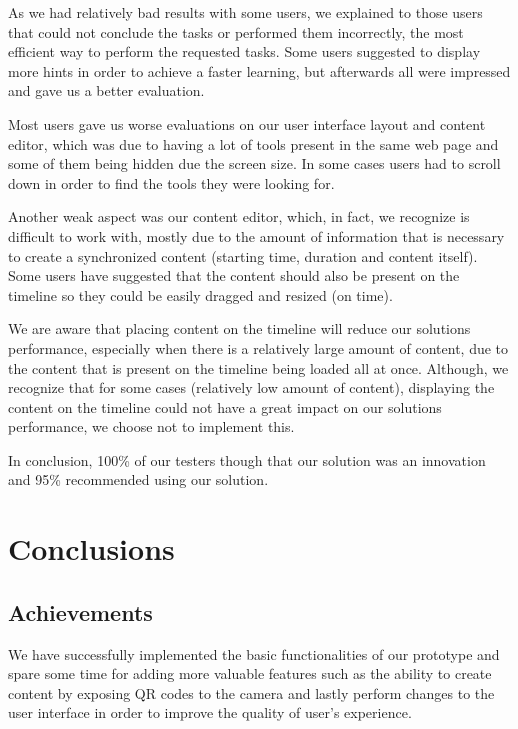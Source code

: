 \documentclass[conference,compsoc,a4paper]{IEEEtran}
\begin{document}
As we had relatively bad results with some users, we explained to those users that could not conclude the tasks or performed them incorrectly, the most efficient way to perform the requested tasks. Some users suggested to display more hints in order to achieve a faster learning, but afterwards all were impressed and gave us a better evaluation.

Most users gave us worse evaluations on our user interface layout and content editor, which was due to having a lot of tools present in the same web page and some of them being hidden due the screen size. In some cases users had to scroll down in order to find the tools they were looking for. 

Another weak aspect was our content editor, which, in fact, we recognize is difficult to work with, mostly due to the amount of information that is necessary to create a synchronized content (starting time, duration and content itself). Some users have suggested that the content should also be present on the timeline so they could be easily dragged and resized (on time).

We are aware that placing content on the timeline will reduce our solutions performance, especially when there is a relatively large amount of content, due to the content that is present on the timeline being loaded all at once. Although, we recognize that for some cases (relatively low amount of content), displaying the content on the timeline could not have a great impact on our solutions performance, we choose not to implement this.

In conclusion, 100\% of our testers though that our solution was an innovation and 95\% recommended using our solution.




\section{Conclusions}
\label{chapter:conclusion}
\subsection{Achievements}
\label{section:achievements}

	We have successfully implemented the basic functionalities of our prototype and spare some time for adding more valuable features such as the ability to create content by exposing \gls{QR} codes to the camera and lastly perform changes to the user interface in order to improve the quality of user's experience.
\end{document}

